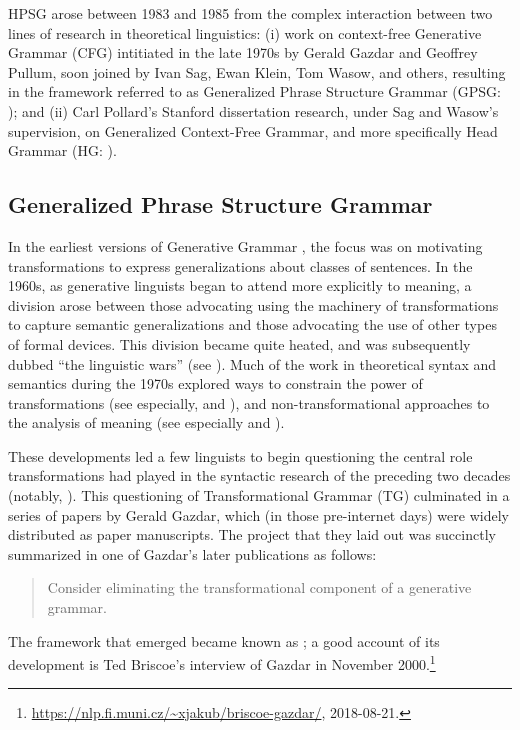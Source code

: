 \documentclass[output=paper]{langsci/langscibook}
\begin{document}
HPSG arose between 1983 and 1985 from the complex interaction between two lines of research in theoretical linguistics: (i) work on context-free Generative Grammar (CFG) intitiated in the late 1970s by Gerald Gazdar and Geoffrey Pullum, soon joined by Ivan Sag, Ewan Klein, Tom Wasow, and others, resulting in the framework referred to as Generalized Phrase Structure Grammar (GPSG: \citet*{GKPS85a}); and (ii) Carl Pollard's Stanford dissertation research, under Sag and Wasow's supervision, on Generalized Context-Free Grammar, and more specifically Head Grammar (HG: \citet{Pollard84a-u}).

\subsection{Generalized Phrase Structure Grammar}

In the earliest versions of Generative Grammar \citep{Chomsky57a}, the focus was on motivating transformations to express generalizations about classes of sentences.  In the 1960s, as generative linguists began to attend more explicitly to meaning, a division arose between those advocating using the machinery of transformations to capture semantic generalizations and those advocating the use of other types of formal devices.  This division became quite heated, and was subsequently dubbed ``the linguistic wars'' (see \citet[Chapter 5]{Newmeyer:1980}).  Much of the work in theoretical syntax and semantics during the 1970s explored ways to constrain the power of transformations (see especially, \citet{Chomsky73a} and \citet{ChomLas1977}), and non-transformational approaches to the analysis of meaning (see especially \citet{Montague74a-ed} and \citet{Dowty79a}).

These developments led a few linguists to begin questioning the central role transformations had played in the syntactic research of the preceding two decades (notably, \citet{Bresnan78a}).  This questioning of Transformational Grammar (TG) culminated in a series of papers by Gerald Gazdar, which (in those pre-internet days) were widely distributed as paper manuscripts.  The project that they laid out was succinctly summarized in one of Gazdar's later publications \citep[]{Gazdar81} as follows:

\begin{quote}
Consider eliminating the transformational component of a generative grammar. \citep[]{Gazdar81}
\end{quote}

\noindent
The framework that emerged became known as ; a good account of its development is Ted Briscoe's interview of Gazdar in November 2000.\footnote{\url{https://nlp.fi.muni.cz/~xjakub/briscoe-gazdar/}, 2018-08-21.}
\end{document}
